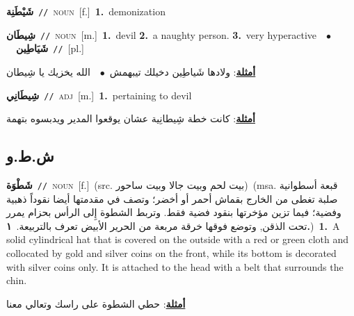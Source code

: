 \documentclass[10pt,a4paper,twoside]{article} %
\begin{document}
\begin{multicols}{2}
{\setlength\topsep{0pt}\textbf{\foreignlanguage{arabic}{شَيْطَنِة}}\ {\color{gray}\texttt{//}\color{black}}\ \textsc{noun}\ [f.]\ \textbf{1.}~demonization\ } \vspace{2mm}

{\setlength\topsep{0pt}\textbf{\foreignlanguage{arabic}{شِيطَان}}\ {\color{gray}\texttt{//}\color{black}}\ \textsc{noun}\ [m.]\ \textbf{1.}~devil  \textbf{2.}~a naughty person.  \textbf{3.}~very hyperactive\ \ $\bullet$\ \ \setlength\topsep{0pt}\textbf{\foreignlanguage{arabic}{شَيَاطِين}}\ {\color{gray}\texttt{//}\color{black}}\ [pl.]\  \begin{flushright}\color{gray}\foreignlanguage{arabic}{\textbf{\underline{\foreignlanguage{arabic}{أمثلة}}}: ولادها شَياطِين دخيلك تيبهمش\ $\bullet$\ \  الله يخزيك يا شِيطان}\end{flushright}\color{black}} \vspace{2mm}

{\setlength\topsep{0pt}\textbf{\foreignlanguage{arabic}{شِيطَانِي}}\ {\color{gray}\texttt{//}\color{black}}\ \textsc{adj}\ [m.]\ \textbf{1.}~pertaining to devil\  \begin{flushright}\color{gray}\foreignlanguage{arabic}{\textbf{\underline{\foreignlanguage{arabic}{أمثلة}}}: كانت خطة شِيطانِية عشان يوقعوا المدير ويدبسوه بتهمة}\end{flushright}\color{black}} \vspace{2mm}

\vspace{-3mm}
\subsection*{\color{blue}\foreignlanguage{arabic}{ش.ط.و}\color{blue}{}} 

{\setlength\topsep{0pt}\textbf{\foreignlanguage{arabic}{شَطْوَة}}\ {\color{gray}\texttt{//}\color{black}}\ \textsc{noun}\ [f.]\ (src. \color{gray}\foreignlanguage{arabic}{بيت لحم وبيت جالا وبيت ساحور}\color{black})\ \color{gray}(msa. \foreignlanguage{arabic}{قبعة أسطوانية صلبة تغطى من الخارج بقماش أحمر أو أخضر؛ وتصف في مقدمتها أيضا نقوداً ذهبية وفضية؛ فيما تزين مؤخرتها بنقود فضية فقط. وتربط الشطوة إِلى الرأس بحزام يمرر تحت الذقن, وتوضع فوقها خرقة مربعة من الحرير الأبيض تعرف بالتربيعة.}~\foreignlanguage{arabic}{\textbf{١.}})\color{black}\ \textbf{1.}~A solid cylindrical hat that is covered on the outside with a red or green cloth and collocated by gold and silver coins on the front, while its bottom is decorated with silver coins only. It is attached to the head with a belt that surrounds the chin.\  \begin{flushright}\color{gray}\foreignlanguage{arabic}{\textbf{\underline{\foreignlanguage{arabic}{أمثلة}}}: حطي الشطوة على راسك وتعالي معنا}\end{flushright}\color{black}} \vspace{2mm}


\end{multicols}
\end{document}
